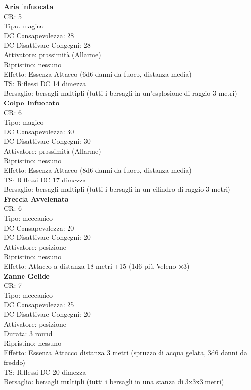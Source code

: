 \documentclass[a4paper,11pt,twoside,openany]{book}
\begin{document}
\begin{multicols}{2}
	\textbf{Aria infuocata}\\
	CR: 5 \\
	Tipo: magico \\
	DC Consapevolezza: 28 \\
	DC Disattivare Congegni: 28 \\
	Attivatore: prossimità (Allarme) \\
	Ripristino: nessuno \\
	Effetto: Essenza Attacco (6d6 danni da fuoco, distanza media)\\
	TS: Riflessi DC 14 dimezza \\
	Bersaglio: bersagli multipli (tutti i bersagli in un’esplosione di raggio 3 metri)\\

	\textbf{Colpo Infuocato}\\
	CR: 6 \\
	Tipo: magico \\
	DC Consapevolezza: 30 \\
	DC Disattivare Congegni: 30 \\
	Attivatore: prossimità (Allarme) \\
	Ripristino: nessuno \\
	Effetto: Essenza Attacco (8d6 danni da fuoco, distanza media)\\
	TS: Riflessi DC 17 dimezza \\
	Bersaglio: bersagli multipli (tutti i bersagli in un cilindro di raggio 3 metri)\\

	\textbf{Freccia Avvelenata}\\
	CR: 6 \\
	Tipo: meccanico \\
	DC Consapevolezza: 20 \\
	DC Disattivare Congegni: 20 \\
	Attivatore: posizione \\
	Ripristino: nessuno \\
	Effetto: Attacco a distanza 18 metri +15 (1d6 più Veleno ×3)\\

	\textbf{Zanne Gelide}\\
	CR: 7 \\
	Tipo: meccanico \\
	DC Consapevolezza: 25 \\
	DC Disattivare Congegni: 20 \\
	Attivatore: posizione \\
	Durata: 3 round \\
	Ripristino: nessuno \\
	Effetto: Essenza Attacco distanza 3 metri (spruzzo di acqua gelata, 3d6 danni da freddo) \\
	TS: Riflessi DC 20 dimezza \\
	Bersaglio: bersagli multipli (tutti i bersagli in una stanza di 3x3x3 metri)\\


\end{multicols}
\end{document}
